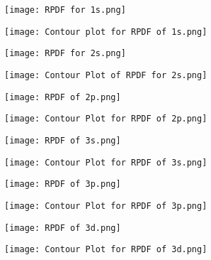 \documentclass[11pt]{article}
\begin{document}
	\begin{figure}[H]
	\centering
	\texttt{[image: RPDF for 1s.png]}
\end{figure}

	\begin{figure}[H]
	\centering
	\texttt{[image: Contour plot for RPDF of 1s.png]}
\end{figure}


	\begin{figure}[H]
	\centering
	\texttt{[image: RPDF for 2s.png]}
\end{figure}

	\begin{figure}[H]
	\centering
	\texttt{[image: Contour Plot of RPDF for 2s.png]}
\end{figure}

	\begin{figure}[H]
	\centering
	\texttt{[image: RPDF of 2p.png]}
\end{figure}

	\begin{figure}[H]
	\centering
	\texttt{[image: Contour Plot for RPDF of 2p.png]}
\end{figure}

	\begin{figure}[H]
	\centering
	\texttt{[image: RPDF of 3s.png]}
\end{figure}

	\begin{figure}[H]
	\centering
	\texttt{[image: Contour Plot for RPDF of 3s.png]}
\end{figure}

	\begin{figure}[H]
	\centering
	\texttt{[image: RPDF of 3p.png]}
\end{figure}

	\begin{figure}[H]
	\centering
	\texttt{[image: Contour Plot for RPDF of 3p.png]}
\end{figure}

	\begin{figure}[H]
	\centering
	\texttt{[image: RPDF of 3d.png]}
\end{figure}


	\begin{figure}[H]
	\centering
	\texttt{[image: Contour Plot for RPDF of 3d.png]}
\end{figure}
\pagebreak
\end{document}
